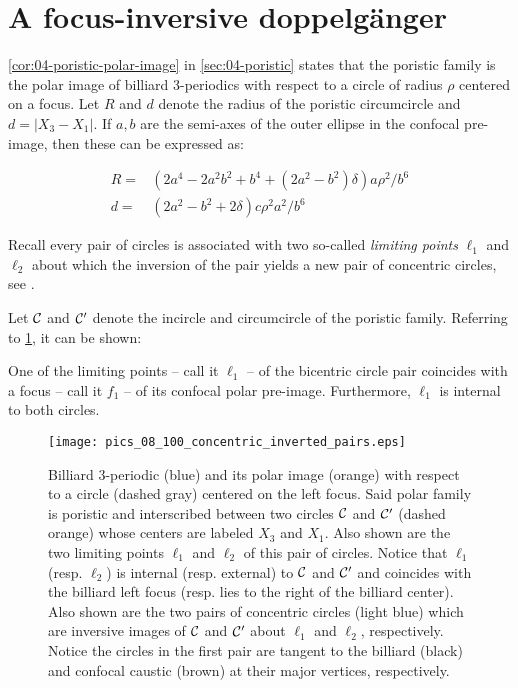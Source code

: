 \section{A focus-inversive doppelgänger}

\cref{cor:04-poristic-polar-image} in \cref{sec:04-poristic} states that the poristic family is the polar image of billiard 3-periodics with respect to a circle of radius $\rho$ centered on a focus. Let $R$ and $d$ denote the radius of the poristic circumcircle and $d=|X_3-X_1|$. If $a,b$ are the semi-axes of the outer ellipse in the confocal pre-image, then these can be expressed as:

\begin{proposition}
\begin{align*}
R =&(2a^4 - 2a^2b^2 + b^4 + (2a^2 -b^2)\delta  )a\rho^2/b^6\\
d=&(2a^2 - b^2 + 2\delta)c\rho^2a^2/b^6
\end{align*}
\end{proposition}

Recall every pair of circles is associated with two so-called {\em limiting points} $\ell_1$ and $\ell_2$ about which the inversion of the pair yields a new pair of concentric circles, see \cite[Limiting points]{mw}.

Let $\mathcal{C}$ and $\mathcal{C}'$ denote the incircle and circumcircle of the poristic family. Referring to \cref{fig:08-concentric-inverted}, it can be shown:

\begin{observation}
One of the limiting points -- call it $\ell_1$ -- of the bicentric circle pair coincides with a focus -- call it $f_1$ -- of its confocal polar pre-image. Furthermore, $\ell_1$ is internal to both circles.
\label{obs:08-ell1}
\end{observation}

\begin{figure}
    \centering
    \texttt{[image: pics\_08\_100\_concentric\_inverted\_pairs.eps]}
    \caption{Billiard 3-periodic (blue) and its polar image (orange) with respect to a circle (dashed gray) centered on the left focus. Said polar family is poristic and interscribed between two circles $\mathcal{C}$ and $\mathcal{C}'$ (dashed orange) whose centers are labeled $X_3$ and $X_1$. Also shown are the two limiting points $\ell_1$ and $\ell_2$ of this pair of circles. Notice that $\ell_1$ (resp. $\ell_2$) is internal (resp. external) to $\mathcal{C}$ and $\mathcal{C}'$ and coincides with the billiard left focus (resp. lies to the right of the billiard center). Also shown are the two pairs of concentric circles (light blue) which are inversive images of $\mathcal{C}$ and $\mathcal{C}'$ about $\ell_1$ and $\ell_2$, respectively. Notice the circles in the first pair are tangent to the billiard (black) and confocal caustic (brown) at their major vertices, respectively.}
    \label{fig:08-concentric-inverted}
\end{figure}

